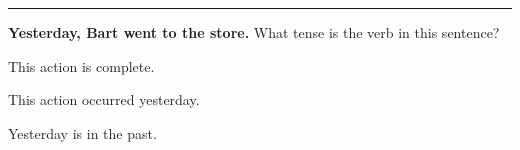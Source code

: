 \documentclass{ximera}
\begin{document}
\rule{1cm}{1pt}

\begin{question}
\begin{solution}
\textbf{Yesterday, Bart went to the store.}
What tense is the verb in this sentence?
\begin{hint}
This action is complete.
\end{hint}
\begin{hint}
This action occurred yesterday.
\end{hint}
\begin{hint}
Yesterday is in the past.
\end{hint}
\end{solution}
\end{question}
\end{document}
